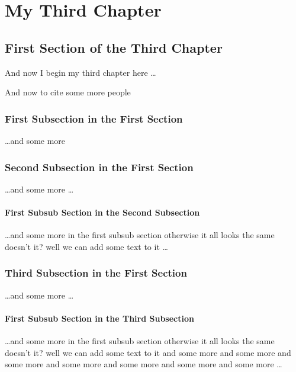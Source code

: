 \chapter{My Third Chapter}

\ifpdf
    \graphicspath{{Chapter5/Figs/Raster/}{Chapter5/Figs/PDF/}{Chapter5/Figs/}}
\else
    \graphicspath{{Chapter5/Figs/Vector/}{Chapter5/Figs/}}
\fi

\section{First Section of the Third Chapter}
And now I begin my third chapter here \dots

And now to cite some more people~\citet{Rea85,Ancey1996}

\subsection{First Subsection in the First Section}
\dots and some more

\subsection{Second Subsection in the First Section}
\dots and some more \dots

\subsubsection{First Subsub Section in the Second Subsection}
\dots and some more in the first subsub section otherwise it all looks the same
doesn't it? well we can add some text to it \dots

\subsection{Third Subsection in the First Section}
\dots and some more \dots

\subsubsection{First Subsub Section in the Third Subsection}
\dots and some more in the first subsub section otherwise it all looks the same
doesn't it? well we can add some text to it and some more and some more and
some more and some more and some more and some more and some more \dots

